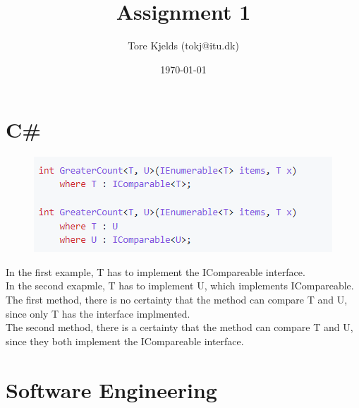 \documentclass{article}
\title{Assignment 1}
\author{Tore Kjelds (tokj@itu.dk)}
\date{\today}
\begin{document}
\maketitle
\section*{C\#}
\begin{figure}[!htb]
    \includegraphics[scale = 0.7]{img/GreaterCount.png}
\end{figure}
In the first example, T has to implement the ICompareable interface. \\
In the second exapmle, T has to implement U, which implements ICompareable. \\ 
The first method, there is no certainty that the method can compare T and U, since only T has the interface implmented. \\
The second method, there is a certainty that the method can compare T and U, since they both implement the ICompareable interface. \\ 
\section*{Software Engineering}
\end{document}
